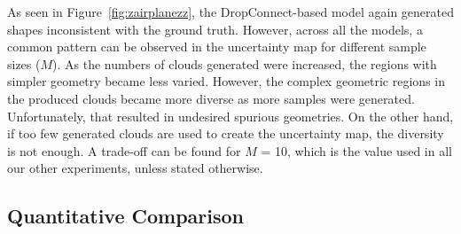         As seen in Figure~\ref{fig:zairplanezz}, the DropConnect-based model again generated shapes inconsistent with the ground truth. However, across all the models, a common pattern can be observed in the uncertainty map for different sample sizes ($M$). As the numbers of clouds generated were increased, the regions with simpler geometry became less varied. However, the complex geometric regions in the produced clouds became more diverse as more samples were generated. Unfortunately, that resulted in undesired spurious geometries. On the other hand, if too few generated clouds are used to create the uncertainty map, the diversity is not enough. A trade-off can be found for $M$ = 10, which is the value used in all our other experiments, unless stated otherwise.


    \subsection{Quantitative Comparison}
    
